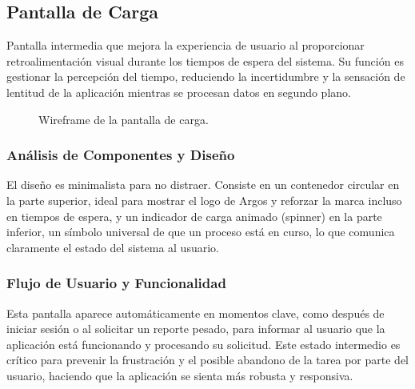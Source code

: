 \clearpage
\subsection{ Pantalla de Carga}
\begin{samepage}\small
Pantalla intermedia que mejora la experiencia de usuario al proporcionar retroalimentación visual durante los tiempos de espera del sistema. Su función es gestionar la percepción del tiempo, reduciendo la incertidumbre y la sensación de lentitud de la aplicación mientras se procesan datos en segundo plano.
\begin{figure}[H]\centering
    \caption{Wireframe de la pantalla de carga.}\label{fig:wf-loader}
\end{figure}
    \subsubsection*{Análisis de Componentes y Diseño}
    El diseño es minimalista para no distraer. Consiste en un contenedor circular en la parte superior, ideal para mostrar el logo de Argos y reforzar la marca incluso en tiempos de espera, y un indicador de carga animado (spinner) en la parte inferior, un símbolo universal de que un proceso está en curso, lo que comunica claramente el estado del sistema al usuario.
    
    \subsubsection*{Flujo de Usuario y Funcionalidad}
    Esta pantalla aparece automáticamente en momentos clave, como después de iniciar sesión o al solicitar un reporte pesado, para informar al usuario que la aplicación está funcionando y procesando su solicitud. Este estado intermedio es crítico para prevenir la frustración y el posible abandono de la tarea por parte del usuario, haciendo que la aplicación se sienta más robusta y responsiva.
\normalsize\end{samepage}